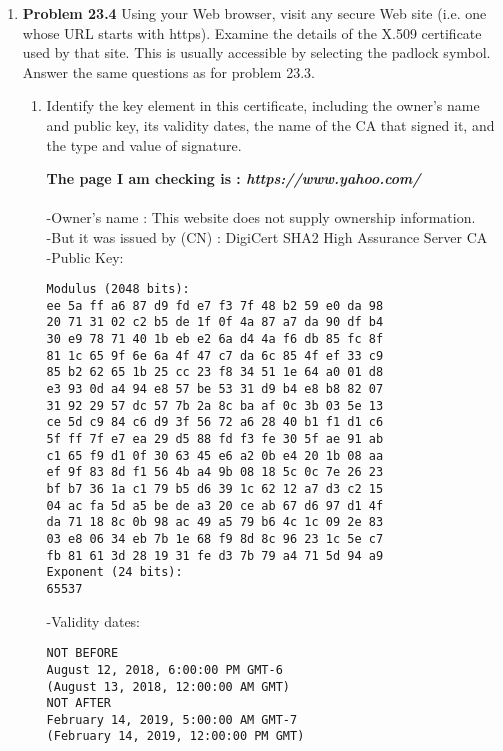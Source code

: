 \documentclass[12pt]{article}
\begin{document}
\begin{enumerate}
	\vspace{10pt}
	
	\item {\textbf{Problem 23.4} Using your Web browser, visit any secure Web site (i.e. one whose URL starts with https). Examine the details of the X.509 certificate used by that site. This is usually accessible by selecting the padlock symbol. Answer the same questions as for problem 23.3.}

\begin{enumerate}
\item {Identify the key element in this certificate, including the owner's name and public key, its validity dates, the name of the CA that signed it, and the type and value of signature.}

\textbf{ The page I am checking is : \textit{https://www.yahoo.com/}} \\\\
-Owner's name :  This website does not supply ownership information. \\
-But it was issued by (CN) : DigiCert SHA2 High Assurance Server CA\\
-Public Key: 
\begin{verbatim}
Modulus (2048 bits):
ee 5a ff a6 87 d9 fd e7 f3 7f 48 b2 59 e0 da 98 
20 71 31 02 c2 b5 de 1f 0f 4a 87 a7 da 90 df b4 
30 e9 78 71 40 1b eb e2 6a d4 4a f6 db 85 fc 8f 
81 1c 65 9f 6e 6a 4f 47 c7 da 6c 85 4f ef 33 c9 
85 b2 62 65 1b 25 cc 23 f8 34 51 1e 64 a0 01 d8 
e3 93 0d a4 94 e8 57 be 53 31 d9 b4 e8 b8 82 07 
31 92 29 57 dc 57 7b 2a 8c ba af 0c 3b 03 5e 13 
ce 5d c9 84 c6 d9 3f 56 72 a6 28 40 b1 f1 d1 c6 
5f ff 7f e7 ea 29 d5 88 fd f3 fe 30 5f ae 91 ab 
c1 65 f9 d1 0f 30 63 45 e6 a2 0b e4 20 1b 08 aa 
ef 9f 83 8d f1 56 4b a4 9b 08 18 5c 0c 7e 26 23 
bf b7 36 1a c1 79 b5 d6 39 1c 62 12 a7 d3 c2 15 
04 ac fa 5d a5 be de a3 20 ce ab 67 d6 97 d1 4f 
da 71 18 8c 0b 98 ac 49 a5 79 b6 4c 1c 09 2e 83 
03 e8 06 34 eb 7b 1e 68 f9 8d 8c 96 23 1c 5e c7 
fb 81 61 3d 28 19 31 fe d3 7b 79 a4 71 5d 94 a9 
Exponent (24 bits):
65537
\end{verbatim}
-Validity dates: 
\begin{verbatim}
NOT BEFORE
August 12, 2018, 6:00:00 PM GMT-6
(August 13, 2018, 12:00:00 AM GMT)
NOT AFTER
February 14, 2019, 5:00:00 AM GMT-7
(February 14, 2019, 12:00:00 PM GMT)
\end{verbatim}


\end{enumerate}
\end{enumerate}
\end{document}
